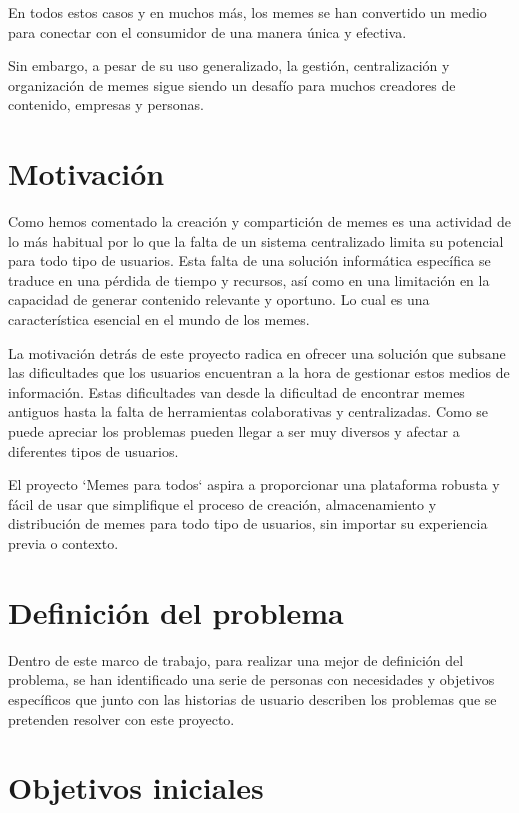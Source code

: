 En todos estos casos y en muchos más, los memes se han convertido un medio para conectar con el consumidor de una manera única y efectiva.

Sin embargo, a pesar de su uso generalizado, la gestión, centralización y organización de memes sigue siendo un desafío para muchos creadores de contenido, empresas y personas.

\section{Motivación}

Como hemos comentado la creación y compartición de memes es una actividad de lo más habitual por lo que la falta de un sistema centralizado limita su potencial para todo tipo de usuarios. Esta falta de una solución informática específica se traduce en una pérdida de tiempo y recursos, así como en una limitación en la capacidad de generar contenido relevante y oportuno. Lo cual es una característica esencial en el mundo de los memes.

La motivación detrás de este proyecto radica en ofrecer una solución que subsane las dificultades que los usuarios encuentran a la hora de gestionar estos medios de información. Estas dificultades van desde la dificultad de encontrar memes antiguos hasta la falta de herramientas colaborativas y centralizadas. Como se puede apreciar los problemas pueden llegar a ser muy diversos y afectar a diferentes tipos de usuarios.

El proyecto `Memes para todos` aspira a proporcionar una plataforma robusta y fácil de usar que simplifique el proceso de creación, almacenamiento y distribución de memes para todo tipo de usuarios, sin importar su experiencia previa o contexto.

\section{Definición del problema}

Dentro de este marco de trabajo, para realizar una mejor de definición del problema, se han identificado una serie de personas con necesidades y objetivos específicos que junto con las historias de usuario describen los problemas que se pretenden resolver con este proyecto.

\section{Objetivos iniciales}

